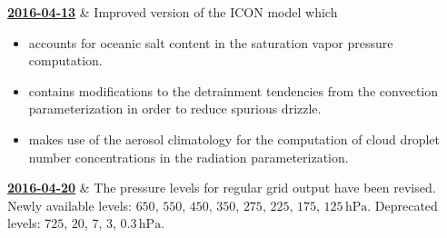 \begin{vtimeline}[description={text width=0.78\textwidth}, 
 row sep=3ex, 
 add bottom line,
 line offset=10pt,
 timeline color=colorBlue,
 timeline color2=colorRed]
  \href{http://www.dwd.de/DE/fachnutzer/forschung_lehre/numerische_wettervorhersage/nwv_aenderungen/_functions/DownloadBox_modellaenderungen/icon/pdf_2016/pdf_icon_13_04_2016.pdf?__blob=publicationFile&v=3}
         {\textbf{2016-04-13}} & Improved version of the ICON model which
                      \small
                      \begin{itemize}
                       \item accounts for oceanic salt content in the saturation vapor pressure computation.
                       \item contains modifications to the detrainment tendencies from the convection parameterization in order to reduce spurious drizzle.
                       \item makes use of the aerosol climatology for the computation of cloud droplet number concentrations in the radiation parameterization.
                      \end{itemize}
                      \endlr
{}  \href{http://www.dwd.de/DE/fachnutzer/forschung_lehre/numerische_wettervorhersage/nwv_aenderungen/_functions/DownloadBox_modellaenderungen/icon/pdf_2016/pdf_icon_20_04_2016.pdf?__blob=publicationFile&v=2}
         {\textbf{2016-04-20}} & The pressure levels for regular grid output have been revised. 
                      Newly available levels: $650$, $550$, $450$, $350$, $275$, $225$, $175$, $125\,\mathrm{hPa}$. 
                      Deprecated levels: $725$, $20$, $7$, $3$, $0.3\,\mathrm{hPa}$.\endlr


\end{vtimeline}
